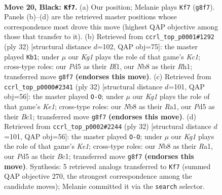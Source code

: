 \documentclass[11pt]{article}
\begin{document}
\clearpage

\begin{figure}[p]\centering
\begin{subfigure}{0.46\textwidth}\centering
\resizebox{\linewidth}{!}{%
\newchessgame
\chessboard[
  setfen={rnr3k1/ppp1b3/q4pp1/P2p1b2/3P1P2/1P2PNP1/3Q4/RNB2RK1 b - - 1 20},
  showmover=false,
  pgfstyle=straightmove, color=movearrow, markmove={g8-f7}
]}
\caption{}
\end{subfigure}\hfill
\begin{subfigure}{0.46\textwidth}\centering
\resizebox{\linewidth}{!}{%
\newchessgame
\chessboard[
  setfen={r1r3k1/2q1bpp1/p1np1n1p/4pP2/4P3/2Q2P2/PPP1NB1P/2KR1B1R w - - 3 17},
  showmover=false,
  pgfstyle=straightmove, color=movearrow, markmove={c1-b1}
]}
\caption{}
\end{subfigure}
\\[4pt]
\begin{subfigure}{0.46\textwidth}\centering
\resizebox{\linewidth}{!}{%
\newchessgame
\chessboard[
  setfen={2q1k2r/r3npbp/p1p3p1/2P1p3/QPPp4/3B4/P4PPP/R1B1K2R w KQk - 0 17},
  showmover=false,
  pgfstyle=straightmove, color=movearrow, markmove={e1-g1}
]}
\caption{}
\end{subfigure}\hfill
\begin{subfigure}{0.46\textwidth}\centering
\resizebox{\linewidth}{!}{%
\newchessgame
\chessboard[
  setfen={2q1k2r/r3npbp/p1p3p1/2P1p3/QPPp4/3B4/P4PPP/R1B1K2R w KQk - 0 17},
  showmover=false,
  pgfstyle=straightmove, color=movearrow, markmove={e1-g1}
]}
\caption{}
\end{subfigure}
\caption{\textbf{Move 20, Black: \texttt{Kf7}.} (a) Our position; Melanie plays \texttt{Kf7} (\texttt{g8f7}). Panels (b)--(d) are the retrieved master positions whose correspondence most drove this move (highest QAP objective among those that transfer to it). (b) Retrieved from \texttt{ccrl\_top\_p0001\#1292} (ply 32) [structural distance $d$=102, QAP obj=75]: the master played \texttt{Kb1}; under $\mu$ our \emph{Kg1} plays the role of that game's \emph{Kc1}; cross-type roles: our \emph{P}d5 as their \emph{B}f1, our \emph{N}b8 as their \emph{R}h1; transferred move \texttt{g8f7} \textbf{(endorses this move)}. (c) Retrieved from \texttt{ccrl\_top\_p0000\#2341} (ply 32) [structural distance $d$=101, QAP obj=56]: the master played \texttt{O-O}; under $\mu$ our \emph{Kg1} plays the role of that game's \emph{Ke1}; cross-type roles: our \emph{N}b8 as their \emph{R}a1, our \emph{P}d5 as their \emph{B}c1; transferred move \texttt{g8f7} \textbf{(endorses this move)}. (d) Retrieved from \texttt{ccrl\_top\_p0002\#2244} (ply 32) [structural distance $d$=101, QAP obj=56]: the master played \texttt{O-O}; under $\mu$ our \emph{Kg1} plays the role of that game's \emph{Ke1}; cross-type roles: our \emph{N}b8 as their \emph{R}a1, our \emph{P}d5 as their \emph{B}c1; transferred move \texttt{g8f7} \textbf{(endorses this move)}. Synthesis: 5 retrieved analogs transferred to \texttt{Kf7} (summed QAP objective 270, the strongest correspondence among the candidate moves); Melanie committed it via the \texttt{search} selector.}
\label{fig:thought-m39}
\end{figure}
\end{document}
